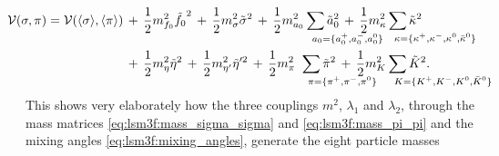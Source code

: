 \begin{equation}
\begin{split}
	\hspace{-2cm} \pot(\sigma,\pi) = \pot(\avg{\sigma},\avg{\pi}) \, &+ \, \frac12 m^2_{f_0} \tilde{f_0}^2  \, + \, \frac12 m^2_{\sigma} \tilde{\sigma}^2 \, + \, \frac12 m^2_{a_0} \sum_{\mathrlap{\!\!a_0 = \{a_0^+,a_0^-,a_0^0\}}} \tilde{a}_0^2               \, + \, \frac12 m^2_{\kappa} \sum_{\mathrlap{\!\!\kappa = \{\kappa^+,\kappa^-,\kappa^0,\bar{\kappa}^0\}}} \tilde{\kappa}^2 \\
	                                                              \, &+ \, \frac12 m^2_{\eta} \tilde{\eta}^2 \, + \, \frac12 m^2_{\eta'} \tilde{\eta}'^2   \, + \, \frac12 m^2_{\pi_{\phantom{0}}} \sum_{\mathrlap{\!\!\pi = \{\pi^+,\pi^-,\pi^0\}}} \tilde{\pi}^2 \, + \, \frac12 m^2_{K} \sum_{\mathrlap{\!\!K = \{K^+,K^-,K^0,\bar{K}^0\}}} \tilde{K}^2. \\
\end{split}
\label{eq:lsm3f:potential_after_diagonalization}
\end{equation}
This shows very elaborately how the three couplings $m^2$, $\lambda_1$ and $\lambda_2$,
through the mass matrices \eqref{eq:lsm3f:mass_sigma_sigma} and \eqref{eq:lsm3f:mass_pi_pi} and the mixing angles \eqref{eq:lsm3f:mixing_angles},
generate the eight particle masses
